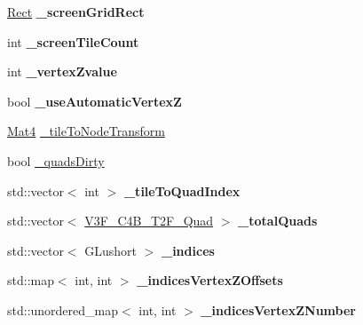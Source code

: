 \begin{DoxyCompactItemize}
\hyperlink{classRect}{Rect} {\bfseries \+\_\+screen\+Grid\+Rect}
\item 
\mbox{\label{classexperimental_1_1TMXLayer_a58d7757157584f2d659cc8b57502a227}} 
int {\bfseries \+\_\+screen\+Tile\+Count}
\item 
\mbox{\label{classexperimental_1_1TMXLayer_aa3d7692da2954c244ac057a1bd8bd22a}} 
int {\bfseries \+\_\+vertex\+Zvalue}
\item 
\mbox{\label{classexperimental_1_1TMXLayer_ab302464748c3cfeae4296c0a44c4b924}} 
bool {\bfseries \+\_\+use\+Automatic\+VertexZ}
\item 
\hyperlink{classMat4}{Mat4} \hyperlink{classexperimental_1_1TMXLayer_a1900d508510307fdcb98505a53d239e7}{\+\_\+tile\+To\+Node\+Transform}
\item 
bool \hyperlink{classexperimental_1_1TMXLayer_a805b73ee1baad5640c1c473e10b83677}{\+\_\+quads\+Dirty}
\item 
\mbox{\label{classexperimental_1_1TMXLayer_a28a86ce508b15d832b86b8fff15db993}} 
std\+::vector$<$ int $>$ {\bfseries \+\_\+tile\+To\+Quad\+Index}
\item 
\mbox{\label{classexperimental_1_1TMXLayer_ae074f842c19033653b2df158f2b9cea2}} 
std\+::vector$<$ \hyperlink{structV3F__C4B__T2F__Quad}{V3\+F\+\_\+\+C4\+B\+\_\+\+T2\+F\+\_\+\+Quad} $>$ {\bfseries \+\_\+total\+Quads}
\item 
\mbox{\label{classexperimental_1_1TMXLayer_ada225ab567bbc96e0db8580b5650aa8c}} 
std\+::vector$<$ G\+Lushort $>$ {\bfseries \+\_\+indices}
\item 
\mbox{\label{classexperimental_1_1TMXLayer_a809ff835497255db8bcef9285f21ba7a}} 
std\+::map$<$ int, int $>$ {\bfseries \+\_\+indices\+Vertex\+Z\+Offsets}
\item 
\mbox{\label{classexperimental_1_1TMXLayer_a631f1aa636c99b3d4ba7c10303ca5d82}} 
std\+::unordered\+\_\+map$<$ int, int $>$ {\bfseries \+\_\+indices\+Vertex\+Z\+Number}
\item 

\end{DoxyCompactItemize}
